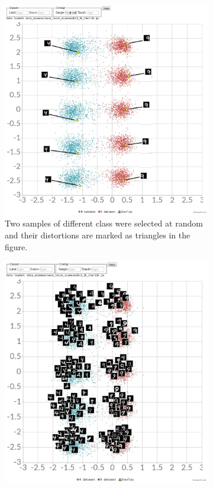 \documentclass[a4paper,12pt]{report}
\begin{document}
\begin{figure}[t]
    \centering
    \begin{subfigure}[t]{0.7\textwidth}
        \centering
        \includegraphics{thesis_figures/mnist_cl2d.jpg}
        \caption{Two samples of different class were selected at random and their distortions are marked as triangles in the figure.}
    \end{subfigure}
    \begin{subfigure}[t]{0.7\textwidth}
        \centering
        \includegraphics{thesis_figures/mnist_cl2d2.jpg}

\end{subfigure}
\end{figure}
\end{document}
